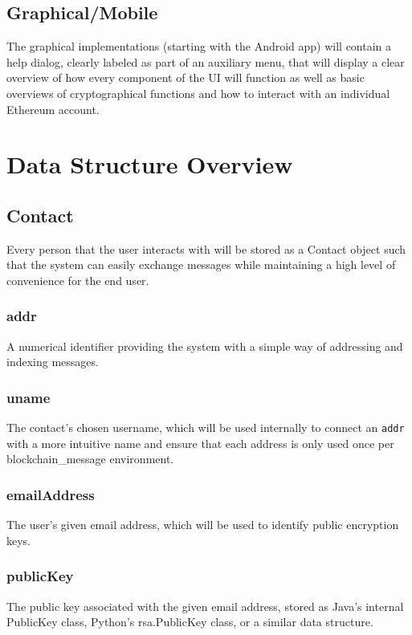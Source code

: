 \documentclass[titlepage]{report}
\begin{document}
\subsection{Graphical/Mobile}
The graphical implementations (starting with the Android app) will contain a help dialog, clearly labeled as part of an auxiliary menu, that will display a clear overview of how every component of the UI will function as well as basic overviews of cryptographical functions and how to interact with an individual \gls{Ethereum} account.

\section{Data Structure Overview}
\subsection{Contact}
Every person that the user interacts with will be stored as a Contact object such that the system can easily exchange messages while maintaining a high level of convenience for the end user.

\subsubsection{addr}
A numerical identifier providing the system with a simple way of addressing and indexing messages.

\subsubsection{uname}
The contact's chosen username, which will be used internally to connect an \texttt{addr} with a more intuitive name and ensure that each address is only used once per blockchain\_message environment.

\subsubsection{emailAddress}
The user's given email address, which will be used to identify public encryption keys.

\subsubsection{publicKey}
The public key associated with the given email address, stored as Java's internal PublicKey class, Python's rsa.PublicKey class, or a similar data structure.
\end{document}

